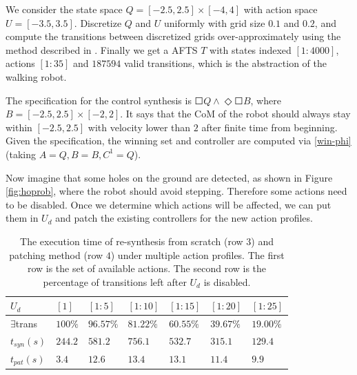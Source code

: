 {\color{black} We consider } the state space $ Q = [-2.5,2.5]\times [-4,4] $ with action space $ U = [-3.5,3.5] $. Discretize $ Q $ and $ U $ uniformly with grid size $ 0.1 $ and $ 0.2 $, and compute the transitions between discretized grids over-approximately  using the method described in \cite{Liu2014,Sun2014}. Finally we get a AFTS $ T $ with states indexed $ [1:4000] $, actions $ [1:35] $ and $ 187594 $ valid transitions, which is the abstraction of the walking robot. 

The specification for the control synthesis is $\Square Q \wedge \Diamond \Square B $,
where $ B=[-2.5,2.5]\times[-2,2] $. It says that the CoM of the robot should always stay within $ [-2.5,2.5] $ with velocity lower than $ 2 $ after finite time from beginning. Given the specification, the winning set and controller are computed via \eqref{win-phi} (taking $ A = Q,B=B , C^1 = Q $).

Now imagine that some holes on the ground are detected, as shown in Figure \ref{fig:hoprob}, where the robot should avoid stepping. Therefore some actions need to be disabled. Once we determine which actions will be affected, we can put them in $ U_d $ and patch the existing controllers for the new action profiles.
\begin{table}
	\centering
	\caption{The execution time of re-synthesis from scratch (row $ 3 $) and patching method (row $ 4 $) under multiple action profiles. The first row is the set of available actions. The second row is the percentage of transitions left after $ U_d $ is disabled.}
	\begin{tabular}{lllllll}
		\hline 
		$ U_d $ & $ [1] $ &$ [1:5] $ & $ [1:10] $ & $ [1:15] $ & $ [1:20] $ & $ [1:25] $ \\ 
		\hline 
		$ \exists $trans & $ 100\% $ & $ 96.57\% $ & $ 81.22\% $ & $ 60.55\% $ & $ 39.67\% $ & $ 19.00\% $\\
		$ t_{syn}(s) $ & $ 244.2 $ & $ 581.2 $ & $ 756.1 $ & $ 532.7 $ & $ 315.1 $ & $ 129.4 $ \\
		$ t_{pat}(s)$ & $ 3.4 $ & $ 12.6 $ & $ 13.4 $ & $ 13.1 $ & $ 11.4 $ & $ 9.9 $ \\ 
		\hline 
	\end{tabular} 
	\label{tab: exper}
\end{table}

